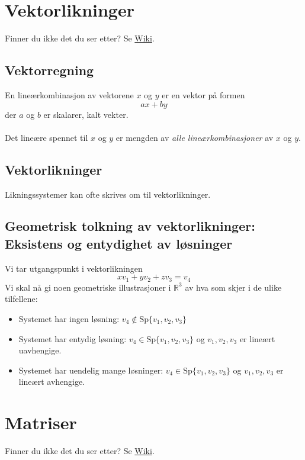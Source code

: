\documentclass{article}
\begin{document}
\clearpage
\section{Vektorlikninger}
Finner du ikke det du ser etter? Se \href{https://www.math.ntnu.no/emner/TMA4110/2020h/notater/3-vektor-og-matriselikninger.pdf}{Wiki}.


\subsection{Vektorregning}
En lineærkombinasjon av vektorene $x$ og $y$ er en vektor på formen
\[ax + by\]
der $a$ og $b$ er skalarer, kalt vekter.
\\\\
Det lineære spennet til $x$ og $y$ er mengden av \textit{alle lineærkombinasjoner} av $x$ og $y$.


\subsection{Vektorlikninger}
Likningssystemer kan ofte skrives om til vektorlikninger.


\subsection{Geometrisk tolkning av vektorlikninger: Eksistens og entydighet av løsninger}
Vi tar utgangspunkt i vektorlikningen
\[ xv_1 + yv_2 + zv_3 = v_4 \]
Vi skal nå gi noen geometriske illustrasjoner i $\mathbb{R}^3$ av hva som skjer i de ulike tilfellene:
\begin{itemize}
    \item Systemet har ingen løsning: $v_4 \notin \text{Sp}\{v_1, v_2, v_3\}$
    \item Systemet har entydig løsning: $v_4 \in \text{Sp}\{v_1, v_2, v_3\}$ og $v_1, v_2, v_3$ er lineært uavhengige.
    \item Systemet har uendelig mange løsninger: $v_4 \in \text{Sp}\{v_1, v_2, v_3\}$ og $v_1, v_2, v_3$ er lineært avhengige.
\end{itemize}




\clearpage
\section{Matriser}
Finner du ikke det du ser etter? Se \href{https://www.math.ntnu.no/emner/TMA4110/2020h/notater/4-matriser.pdf}{Wiki}.
\end{document}
